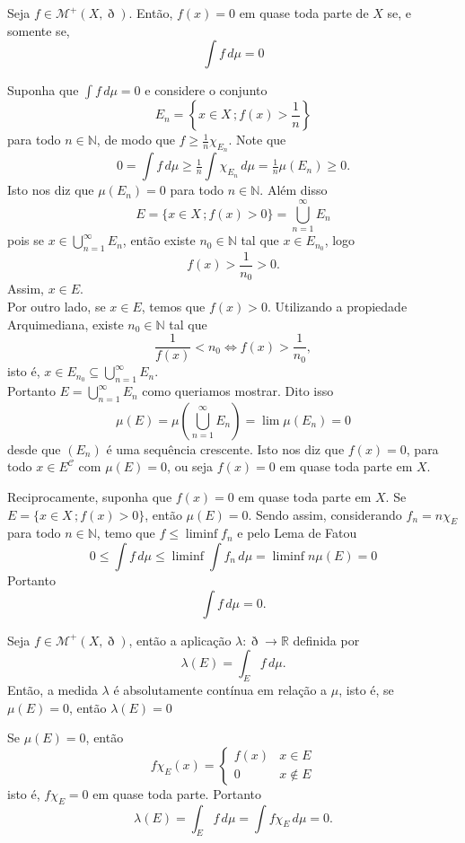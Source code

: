 \documentclass[a4paper, 11pt]{book}
\theoremstyle{definition}
\newcommand{\bN}{\mathbb{N}}
\newcommand{\bR}{\mathbb{R}}
\newcommand{\cC}{\mathcal{C}}
\newcommand{\cM}{\mathcal{M}}
\begin{document}
\begin{cbox} \label{cl:integral-medida-nula}
    Seja $f \in \cM^+(X,\eth)$.
    Então, $f(x) = 0$ em quase toda parte de $X$ se, e somente se,
    \[
        \int f \, d\mu = 0
    \]
\end{cbox}
\begin{prf}
    Suponha que $\displaystyle \int f\,d\mu = 0$ e considere o conjunto
    \[
        E_n = \left\{ x \in X \,; f(x) > \frac{1}{n} \right\}
    \]
    para todo $n \in \bN$, de modo que $f \geqslant \frac{1}{n}\chi_{E_n}$.
    Note que
    \[
        0 = \int f \,d\mu \geqslant \tfrac{1}{n} \! \int \chi_{E_n} \, d\mu = \tfrac{1}{n}\mu(E_n) \geqslant 0.
    \]
    Isto nos diz que $\mu(E_n) = 0$ para todo $n \in \bN$. Além disso
    \[
        E = \{x \in X \,; f(x) > 0\} = \bigcup_{n=1}^{\infty} E_n
    \]
    pois se $x \in \bigcup_{n=1}^{\infty} E_n$, então existe $n_0 \in \bN$ tal que $x \in E_{n_0}$, logo
    \[
        f(x) > \frac{1}{n_0} > 0.
    \]
    Assim, $x \in E$.\\[5pt]
    Por outro lado, se $x \in E$, temos que $f(x) > 0$.
    Utilizando a propiedade Arquimediana, existe $n_0 \in \bN$ tal que
    \[
        \frac{1}{f(x)} < n_0 \iff f(x) > \frac{1}{n_0},
    \]
    isto é, $x \in E_{n_0} \subseteq \bigcup_{n=1}^{\infty} E_n$.\\[5pt]
    Portanto $E = \bigcup_{n=1}^{\infty} E_n$ como queriamos mostrar. Dito isso
    \[
        \mu(E) = \mu\left( \bigcup_{n=1}^{\infty} E_n \right) = \lim \mu(E_n) = 0
    \]
    desde que $(E_n)$ é uma sequência crescente.
    Isto nos diz que $f(x) = 0$, para todo $x \in E^{\cC}$ com $\mu(E) = 0$, ou seja $f(x) = 0$ em quase toda parte em $X$.

    Reciprocamente, suponha que $f(x) = 0$ em quase toda parte em $X$. Se $E = \{x \in X \,; f(x) > 0\}$, então $\mu(E) = 0$.
    Sendo assim, considerando $f_n = n \chi_E$ para todo $n \in \bN$, temo que $f \leqslant \liminf f_n$ e pelo Lema de Fatou
    \[
        0 \leqslant \int f \, d\mu \leqslant \liminf \int f_n \,d\mu = \liminf n\mu(E) = 0
    \]
    Portanto
    \[
        \int f \, d\mu = 0.
    \]
\end{prf}

\begin{cbox} \label{cl:medida-absolutamente-continua}
    Seja $f \in \cM^+(X,\eth)$, então a aplicação $\lambda : \eth \to \bR$ definida por
    \[
        \lambda(E) = \int_E f \, d\mu.
    \]
    Então, a medida $\lambda$ é absolutamente contínua em relação a $\mu$, isto é, se $\mu(E) = 0$, então $\lambda(E) = 0$
\end{cbox}
\begin{prf}
    Se $\mu(E) = 0$, então
    \[
        f\chi_E(x) = 
        \left\{
            \begin{array}{cl}
                f(x) & x \in E\\
                0 & x \not\in E
            \end{array}
        \right.
    \]
    isto é, $f \chi_E = 0$ em quase toda parte. Portanto
    \[
        \lambda(E) = \int_E f \,d\mu = \int f\chi_E \, d\mu = 0.
    \]
\end{prf}
\end{document}
